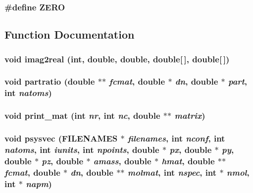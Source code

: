 \subsubsection{\setlength{\rightskip}{0pt plus 5cm}\#define ZERO}\label{md__nmaout_8c_c328e551bde3d39b6d7b8cc9e048d941}




\subsection{Function Documentation}
\subsubsection{\setlength{\rightskip}{0pt plus 5cm}void imag2real (int, double, double, double[$\,$], double[$\,$])\hspace{0.3cm}{\tt  [static]}}\label{md__nmaout_8c_4f341a7a3e35595344570323ca3d7d1b}


\subsubsection{\setlength{\rightskip}{0pt plus 5cm}void partratio (double $\ast$$\ast$ {\em fcmat}, double $\ast$ {\em dn}, double $\ast$ {\em part}, int {\em natoms})}\label{md__nmaout_8c_f16ff482025a0122cbc39dfa823e5fa5}


\subsubsection{\setlength{\rightskip}{0pt plus 5cm}void print\_\-mat (int {\em nr}, int {\em nc}, double $\ast$$\ast$ {\em matrix})}\label{md__nmaout_8c_e03c8642bacdbe20ef827ce0ff30a31e}


\subsubsection{\setlength{\rightskip}{0pt plus 5cm}void psysvec ({\bf FILENAMES} $\ast$ {\em filenames}, int {\em nconf}, int {\em natoms}, int {\em iunits}, int {\em npoints}, double $\ast$ {\em px}, double $\ast$ {\em py}, double $\ast$ {\em pz}, double $\ast$ {\em amass}, double $\ast$ {\em hmat}, double $\ast$$\ast$ {\em fcmat}, double $\ast$ {\em dn}, double $\ast$$\ast$ {\em molmat}, int {\em nspec}, int $\ast$ {\em nmol}, int $\ast$ {\em napm})}\label{md__nmaout_8c_3d449745f510816c60dc888dd64c6d94}



